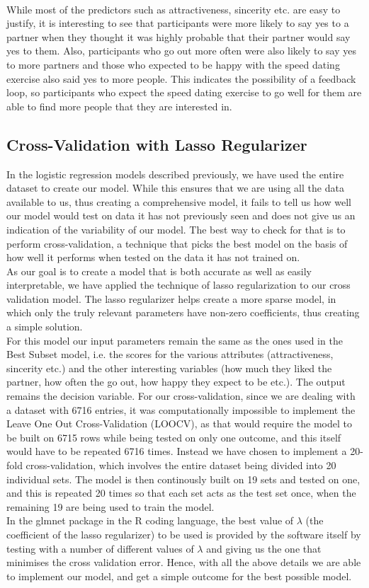 \documentclass{article}
\begin{document}
\null\\
While most of the predictors such as attractiveness, sincerity etc. are easy to justify, it is interesting to see that participants were more likely to say yes to a partner when they thought it was highly probable that their partner would say yes to them. Also, participants who go out more often were also likely to say yes to more partners and those who expected to be happy with the speed dating exercise also said yes to more people. This indicates the possibility of a feedback loop, so participants who expect the speed dating exercise to go well for them are able to find more people that they are interested in.
%
\subsection{Cross-Validation with Lasso Regularizer}
In the logistic regression models described previously, we have used the entire dataset to create our model. While this ensures that we are using all the data available to us, thus creating a comprehensive model, it fails to tell us how well our model would test on data it has not previously seen and does not give us an indication of the variability of our model. The best way to check for that is to perform cross-validation, a technique that picks the best model on the basis of how well it performs when tested on the data it has not trained on. 
\null\\
As our goal is to create a model that is both accurate as well as easily interpretable, we have applied the technique of lasso regularization to our cross validation model. The lasso regularizer helps create a more sparse model, in which only the truly relevant parameters have non-zero coefficients, thus creating a simple solution.
\null\\
For this model our input parameters remain the same as the ones used in the Best Subset model, i.e. the scores for the various attributes (attractiveness, sincerity etc.) and the other interesting variables (how much they liked the partner, how often the go out, how happy they expect to be etc.). The output remains the decision variable. For our cross-validation, since we are dealing with a dataset with 6716 entries, it was computationally impossible to implement the Leave One Out Cross-Validation (LOOCV), as that would require the model to be built on 6715 rows while being tested on only one outcome, and this itself would have to be repeated 6716 times. Instead we have chosen to implement a 20-fold cross-validation, which involves the entire dataset being divided into 20 individual sets. The model is then continously built on 19 sets and tested on one, and this is repeated 20 times so that each set acts as the test set once, when the remaining 19 are being used to train the model.
\null\\
In the glmnet package in the R coding language, the best value of $\lambda$ (the coefficient of the lasso regularizer) to be used is provided by the software itself by testing with a number of different values of $\lambda$ and giving us the one that minimises the cross validation error. Hence, with all the above details we are able to implement our model, and get a simple outcome for the best possible model.
%
\end{document}
